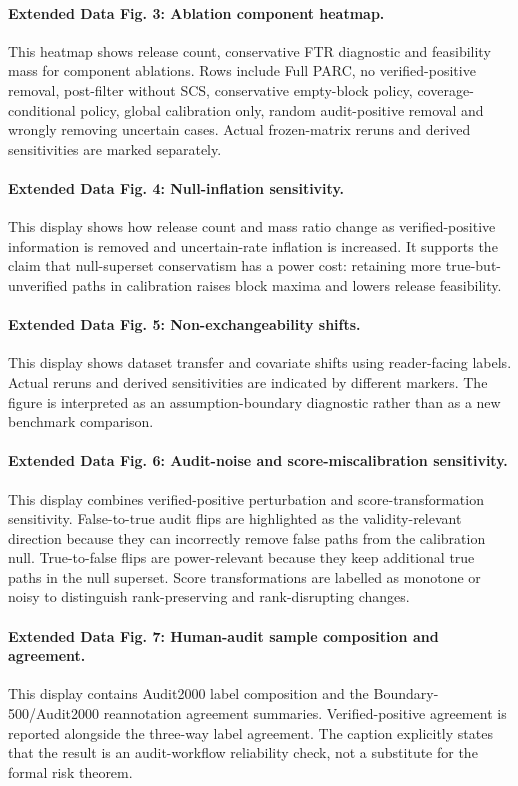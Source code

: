 \documentclass[11pt]{article}
\begin{document}
\paragraph{Extended Data Fig. 3: Ablation component heatmap.}
This heatmap shows release count, conservative FTR diagnostic and feasibility mass for component ablations.
Rows include Full PARC, no verified-positive removal, post-filter without SCS, conservative empty-block policy, coverage-conditional policy, global calibration only, random audit-positive removal and wrongly removing uncertain cases.
Actual frozen-matrix reruns and derived sensitivities are marked separately.

\paragraph{Extended Data Fig. 4: Null-inflation sensitivity.}
This display shows how release count and mass ratio change as verified-positive information is removed and uncertain-rate inflation is increased.
It supports the claim that null-superset conservatism has a power cost: retaining more true-but-unverified paths in calibration raises block maxima and lowers release feasibility.

\paragraph{Extended Data Fig. 5: Non-exchangeability shifts.}
This display shows dataset transfer and covariate shifts using reader-facing labels.
Actual reruns and derived sensitivities are indicated by different markers.
The figure is interpreted as an assumption-boundary diagnostic rather than as a new benchmark comparison.

\paragraph{Extended Data Fig. 6: Audit-noise and score-miscalibration sensitivity.}
This display combines verified-positive perturbation and score-transformation sensitivity.
False-to-true audit flips are highlighted as the validity-relevant direction because they can incorrectly remove false paths from the calibration null.
True-to-false flips are power-relevant because they keep additional true paths in the null superset.
Score transformations are labelled as monotone or noisy to distinguish rank-preserving and rank-disrupting changes.

\paragraph{Extended Data Fig. 7: Human-audit sample composition and agreement.}
This display contains Audit2000 label composition and the Boundary-500/Audit2000 reannotation agreement summaries.
Verified-positive agreement is reported alongside the three-way label agreement.
The caption explicitly states that the result is an audit-workflow reliability check, not a substitute for the formal risk theorem.
\end{document}
